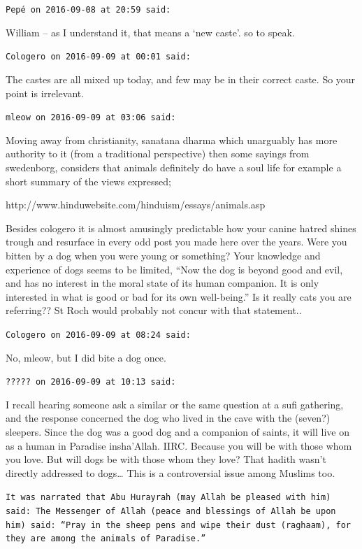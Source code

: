 \begin{footnotesize}
\begin{sffamily}
\hfill

\texttt{Pepé on 2016-09-08 at 20:59 said: }

William – as I understand it, that means a `new caste'. so to speak.


\hfill

\texttt{Cologero on 2016-09-09 at 00:01 said: }

The castes are all mixed up today, and few may be in their correct caste. So your point is irrelevant.


\hfill

\texttt{mleow on 2016-09-09 at 03:06 said: }

Moving away from christianity, sanatana dharma which unarguably has more authority to it (from a traditional perspective) then some sayings from swedenborg, considers that animals definitely do have a soul life for example a short summary of the views expressed;

http://www.hinduwebsite.com/hinduism/essays/animals.asp

Besides cologero it is almost amusingly predictable how your canine hatred shines trough and resurface in every odd post you made here over the years. Were you bitten by a dog when you were young or something? Your knowledge and experience of dogs seems to be limited, “Now the dog is beyond good and evil, and has no interest in the moral state of its human companion. It is only interested in what is good or bad for its own well-being.” Is it really cats you are referring?? St Roch would probably not concur with that statement..


\hfill

\texttt{Cologero on 2016-09-09 at 08:24 said: }

No, mleow, but I did bite a dog once.


\hfill

\texttt{????? on 2016-09-09 at 10:13 said: }

I recall hearing someone ask a similar or the same question at a sufi gathering, and the response concerned the dog who lived in the cave with the (seven?) sleepers. Since the dog was a good dog and a companion of saints, it will live on as a human in Paradise insha'Allah. IIRC. Because you will be with those whom you love. But will dogs be with those whom they love? That hadith wasn't directly addressed to dogs… This is a controversial issue among Muslims too.

\texttt{It was narrated that Abu Hurayrah (may Allah be pleased with him) said: The Messenger of Allah (peace and blessings of Allah be upon him) said: “Pray in the sheep pens and wipe their dust (raghaam), for they are among the animals of Paradise.”}



\end{sffamily}
\end{footnotesize}
